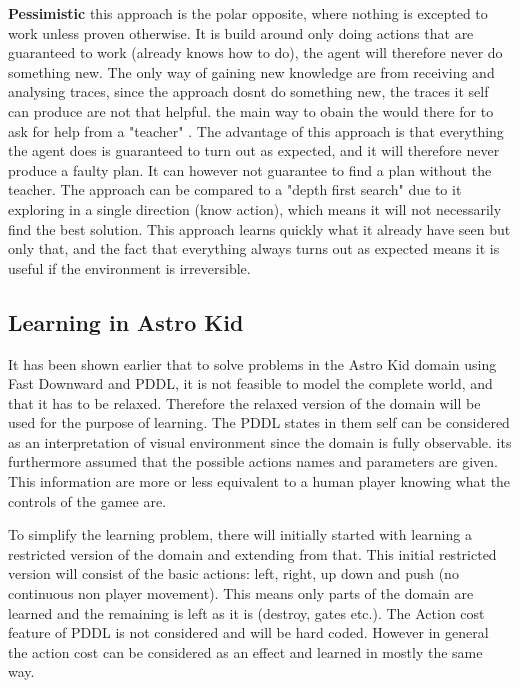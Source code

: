 	\textbf{Pessimistic} this approach is the polar opposite, where nothing is excepted to work unless proven otherwise. It is build around only doing actions that are guaranteed to work (already knows how to do), the agent will therefore never do something new. The only way of gaining new knowledge are from receiving and analysing traces, since the approach dosnt do something new, the traces it self can produce are not that helpful. the main way to obain the would there for to ask for help from a "teacher" \cite{Action-Schemas}.
	The advantage of this approach is that everything the agent does is guaranteed to turn out as expected, and it will therefore never produce a faulty plan. It can however not guarantee to find a plan without the teacher. The approach can be compared to a "depth first search" due to it exploring in a single direction (know action), which means it will not necessarily find the best solution. 
	This approach learns quickly what it already have seen but only that, and the fact that everything always turns out as expected means it is useful if the environment is irreversible.
	
	

	
		
		
	
	\subsection{Learning in Astro Kid}
	It has been shown earlier that to solve problems in the Astro Kid domain using Fast Downward and PDDL, it is not feasible to model the complete world, and that it has to be relaxed. Therefore the relaxed version of the domain will be used for the purpose of learning. The PDDL states in them self can be considered as an interpretation of visual environment since the domain is fully observable. its furthermore assumed that the possible actions names and parameters are given. This information are more or less equivalent to a human player knowing what the controls of the gamee are. 
	
	
	To simplify the learning problem, there will initially started with learning a restricted version of the domain and extending from that. This initial restricted version will consist of the basic actions: left, right, up down and push (no continuous non player movement). This means only parts of the domain are learned and the remaining is left as it is (destroy, gates etc.). The Action cost feature of PDDL is not considered and will be hard coded. However in general the action cost can be considered as an effect and learned in mostly the same way.

